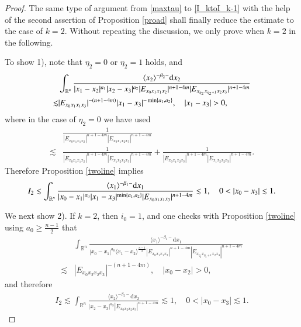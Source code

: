 \documentclass[11pt,reqno]{amsart}
\def\d{{\rm d}}
\numberwithin{equation}{section}
\theoremstyle{definition}
\begin{document}
\begin{proof}
	The same type of argument from \eqref{maxtau} to \eqref{I_ktoI_k-1} with the help of the second assertion of Proposition \ref{proad} shall finally reduce the estimate to the case of $k=2$. Without repeating the discussion, we only prove when $k=2$ in the following.
	
	To show 1), note that $\eta_2=0$ or $\eta_2=1$ holds, and
	\begin{equation*}
		\begin{split}
			&\int_{\mathbb{R}^{n}}\frac{\langle x_2\rangle^{-\beta_2-}\d x_2}{|x_1-x_2|^{a_1}|x_2-x_3|^{a_2}|E_{x_0x_1x_1x_2}|^{n+1-4m}|E_{x_{\eta_2}x_{\eta_2+1}x_2x_3}|^{n+1-4m}}\\
			\lesssim&|E_{x_0x_1x_1x_3}|^{-(n+1-4m)}|x_1-x_3|^{-\min\{a_1,a_2\}},\quad|x_1-x_3|>0,
		\end{split}
	\end{equation*}
	where in the case of $\eta_2=0$ we have used
	\begin{equation*}
		\begin{split}
			&\frac{1}{|E_{x_0x_1x_1x_2}|^{n+1-4m}|E_{x_0x_1x_2x_3}|^{n+1-4m}}\\
			\lesssim&\frac{1}{|E_{x_0x_1x_1x_2}|^{n+1-4m}|E_{x_1x_2x_2x_3}|^{n+1-4m}}+\frac{1}{|E_{x_0x_1x_2x_3}|^{n+1-4m}|E_{x_1x_2x_2x_3}|^{n+1-4m}}.
		\end{split}
	\end{equation*}
	Therefore Proposition \ref{twoline} implies
	\begin{equation*}
		I_2\lesssim\int_{\mathbb{R}^n}\frac{\langle x_1\rangle^{-\beta_1-}\d x_1}{|x_0-x_1|^{a_0}|x_1-x_3|^{\min\{a_1,a_2\}}|E_{x_0x_1x_1x_3}|^{n+1-4m}}\lesssim1,\quad0<|x_0-x_3|\lesssim1.
	\end{equation*}
	
	We next show 2). If $k=2$, then $i_0=1$, and one checks with Proposition \ref{twoline} using $a_0\geq\frac{n-1}{2}$ that
	\begin{equation*}
		\begin{split}
			&\int_{\mathbb{R}^n}\frac{\langle x_1\rangle^{-\beta_1-} \mathrm{d}x_1}{|x_0-x_1|^{a_0}\langle x_1-x_2\rangle^\frac{n-1}{2}|E_{x_0x_1x_1x_2}|^{n+1-4m}|E_{x_{\eta_2}x_{\eta_2+1}x_2x_3}|^{n+1-4m}}\\
			\lesssim&|E_{x_0x_2x_2x_3}|^{-(n+1-4m)},\quad|x_0-x_2|>0,
		\end{split}
	\end{equation*}
	and therefore
	\begin{equation*}
		\begin{split}
			I_2\lesssim\int_{\mathbb{R}^n}\frac{\langle x_2\rangle^{-\beta_2-}\mathrm{d}x_2}{|x_2-x_3|^{a_3}|E_{x_0x_2x_2x_3}|^{n+1-4m}}\lesssim1,\quad0<|x_0-x_3|\lesssim1.
		\end{split}
	\end{equation*}
	
	
	
\end{proof}
\end{document}
